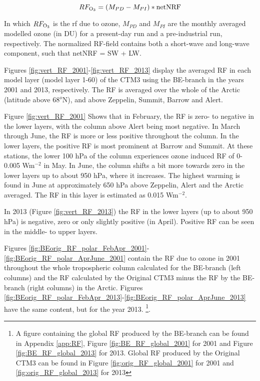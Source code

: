 \begin{equation}
    RF_{\mathrm{O_3}} = (M_{PD} - M_{PI})*\text{netNRF}
    \label{eqn:RF}
\end{equation}

In which $RF_{\mathrm{O_3}}$ is the \acrshort{rf} due to ozone, $M_{PD}$ and $M_{PI}$ are the monthly averaged modelled ozone (in DU) for a present-day run and a pre-industrial run, respectively. The normalized RF-field contains both a short-wave and long-wave component, such that netNRF = SW + LW.

\medskip

Figures \ref{fig:vert_RF_2001}-\ref{fig:vert_RF_2013} display the averaged RF in each model layer (model layer 1-60) of the CTM3 using the BE-branch in the years 2001 and 2013, respectively. The RF is averaged over the whole of the Arctic (latitude above 68$^o$N), and above Zeppelin, Summit, Barrow and Alert. 

\medskip

Figure \ref{fig:vert_RF_2001} Shows that in February, the RF is zero- to negative in the lower layers, with the column above Alert being most negative. In March through June, the RF is more or less positive throughout the column. In the lower layers, the positive RF is most prominent at Barrow and Summit. At these stations, the lower 100 hPa of the column experiences ozone induced RF of 0-0.005 Wm$^{-2}$ in May. In June, the column shifts a bit more towards zero in the lower layers up to about 950 hPa, where it increases. The highest warming is found in June at approximately 650 hPa above Zeppelin, Alert and the Arctic averaged. The RF in this layer is estimated as 0.015 Wm$^{-2}$. 


\medskip

In 2013 (Figure \ref{fig:vert_RF_2013}) the RF in the lower layers (up to about 950 hPa) is negative, zero or only slightly positive (in April). Positive RF can be seen in the middle- to upper layers. 




\medskip


Figures \ref{fig:BEorig_RF_polar_FebApr_2001}-\ref{fig:BEorig_RF_polar_AprJune_2001} contain the RF due to ozone in 2001 throughout the whole tropospheric column calculated for the BE-branch (left columns) and the RF calculated by the Original CTM3 minus the RF by the BE-branch (right columns) in the Arctic. Figures \ref{fig:BEorig_RF_polar_FebApr_2013}-\ref{fig:BEorig_RF_polar_AprJune_2013} have the same content, but for the year 2013. \footnote{A figure containing the global RF produced by the BE-branch can be found in Appendix \ref{app:RF}, Figure \ref{fig:BE_RF_global_2001} for 2001 and Figure \ref{fig:BE_RF_global_2013} for 2013. Global RF produced by the Original CTM3 can be found in Figure \ref{fig:orig_RF_global_2001} for 2001 and \ref{fig:orig_RF_global_2013} for 2013}. 
\medskip 

